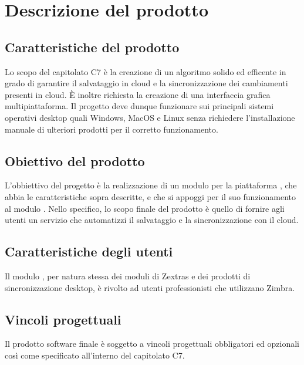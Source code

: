 \section{Descrizione del prodotto}
\subsection{Caratteristiche del prodotto}
Lo scopo del capitolato C7 è la creazione di un algoritmo solido ed efficente in grado di garantire il salvataggio in cloud e la sincronizzazione dei cambiamenti presenti in cloud. È inoltre richiesta la creazione di una interfaccia grafica multipiattaforma. Il progetto deve dunque funzionare sui principali sistemi operativi desktop quali Windows, MacOS e Linux senza richiedere l'installazione manuale di ulteriori prodotti per il corretto funzionamento. 
\subsection{Obiettivo del prodotto}
L'obbiettivo del progetto è la realizzazione di un modulo per la piattaforma , che abbia le caratteristiche sopra descritte, e che si appoggi per il suo funzionamento al modulo .
Nello specifico, lo scopo finale del prodotto è quello di fornire agli utenti un servizio che automatizzi il salvataggio e la sincronizzazione con il cloud.
\subsection{Caratteristiche degli utenti}
Il modulo \progetto{}, per natura stessa dei moduli di Zextras e dei prodotti di sincronizzazione desktop, è rivolto ad utenti professionisti che utilizzano Zimbra. 
\subsection{Vincoli progettuali}
Il prodotto software finale è soggetto a vincoli progettuali obbligatori ed opzionali così come specificato all'interno del capitolato C7.